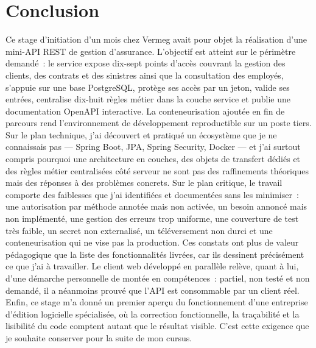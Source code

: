 \documentclass[12pt,a4paper]{report}
\begin{document}
\chapter*{Conclusion}
Ce stage d'initiation d'un mois chez Vermeg avait pour objet la réalisation d'une mini-API REST de gestion d'assurance. L'objectif est atteint sur le périmètre demandé~: le service expose dix-sept points d'accès couvrant la gestion des clients, des contrats et des sinistres ainsi que la consultation des employés, s'appuie sur une base PostgreSQL, protège ses accès par un jeton, valide ses entrées, centralise dix-huit règles métier dans la couche service et publie une documentation OpenAPI interactive. La conteneurisation ajoutée en fin de parcours rend l'environnement de développement reproductible sur un poste tiers.
Sur le plan technique, j'ai découvert et pratiqué un écosystème que je ne connaissais pas — Spring Boot, JPA, Spring Security, Docker — et j'ai surtout compris pourquoi une architecture en couches, des objets de transfert dédiés et des règles métier centralisées côté serveur ne sont pas des raffinements théoriques mais des réponses à des problèmes concrets.
Sur le plan critique, le travail comporte des faiblesses que j'ai identifiées et documentées sans les minimiser~: une autorisation par méthode annotée mais non activée, un besoin annoncé mais non implémenté, une gestion des erreurs trop uniforme, une couverture de test très faible, un secret non externalisé, un téléversement non durci et une conteneurisation qui ne vise pas la production. Ces constats ont plus de valeur pédagogique que la liste des fonctionnalités livrées, car ils dessinent précisément ce que j'ai à travailler. Le client web développé en parallèle relève, quant à lui, d'une démarche personnelle de montée en compétences~: partiel, non testé et non demandé, il a néanmoins prouvé que l'API est consommable par un client réel.
Enfin, ce stage m'a donné un premier aperçu du fonctionnement d'une entreprise d'édition logicielle spécialisée, où la correction fonctionnelle, la traçabilité et la lisibilité du code comptent autant que le résultat visible. C'est cette exigence que je souhaite conserver pour la suite de mon cursus.
\newpage
\end{document}
